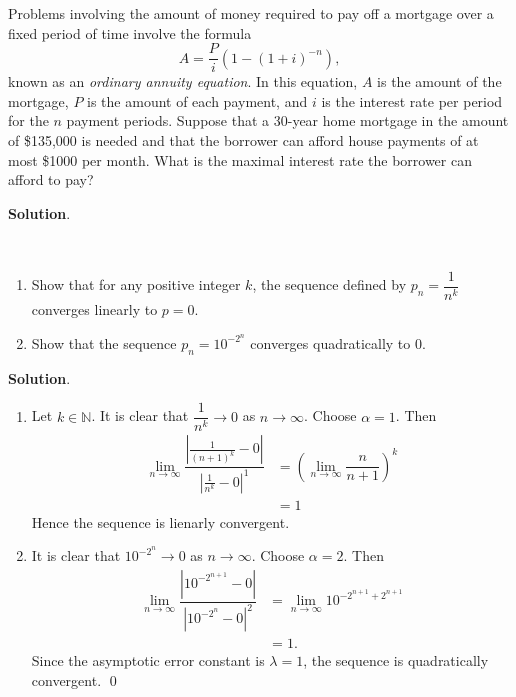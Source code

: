\documentclass[11pt]{article}
\theoremstyle{break}
\numberwithin{equation}{theorem}
\begin{document}
\newpage
\begin{problem}\label{problem 8}
    Problems involving the amount of money required to pay off a mortgage over a fixed period of time involve the formula
    \begin{equation*}
        A=\dfrac{P}{i}\left(1-(1+i)^{-n}\right),
    \end{equation*}
    known as an \emph{ordinary annuity equation}. In this equation, $A$ is the amount of the mortgage, $P$ is the amount of each payment, and $i$ is the interest rate per period for the $n$ payment periods. Suppose that a 30-year home mortgage in the amount of \$135,000 is needed and that the borrower can afford house payments of at most \$1000 per month. What is the maximal interest rate the borrower can afford to pay?
\end{problem}
\textbf{Solution}.


\newpage
\begin{problem}\label{problem 9}$\ $
    \begin{enumerate}
        \item Show that for any positive integer $k$, the sequence defined by $p_n=\dfrac{1}{n^k}$ converges linearly to $p=0$.
        \item Show that the sequence $p_n=10^{-2^n}$ converges quadratically to $0$.
    \end{enumerate}
\end{problem}
\textbf{Solution}.
\begin{enumerate}
    \item Let $k\in\mathbb{N}$. It is clear that $\dfrac{1}{n^k}\to0$ as $n\to\infty$. Choose $\alpha=1$. Then
    \begin{align*}
        \lim_{n\to\infty}\dfrac{\left\lvert\frac{1}{(n+1)^k}-0\right\rvert}{\left\lvert\frac{1}{n^k}-0\right\rvert^1}&=\left(\lim_{n\to\infty}\dfrac{n}{n+1}\right)^k\\
        &=1
    \end{align*}
    Hence the sequence is lienarly convergent.
    \item It is clear that $10^{-2^n}\to0$ as $n\to\infty$. Choose $\alpha=2$. Then
    \begin{align*}
        \lim_{n\to\infty}\dfrac{\left\lvert10^{-2^{n+1}}-0\right\rvert}{\left\lvert10^{-2^n}-0\right\rvert^2}&=\lim_{n\to\infty}10^{-2^{n+1}+2^{n+1}}\\
        &=1.
    \end{align*}
    Since the asymptotic error constant is $\lambda=1$, the sequence is quadratically convergent. \qed
\end{enumerate}
\end{document}
